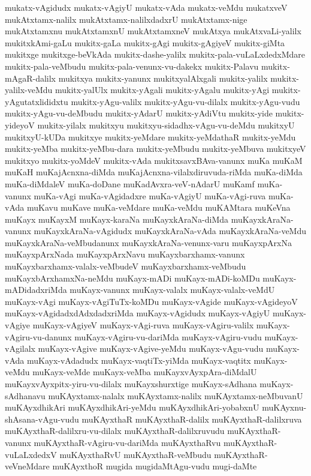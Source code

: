 {mukatx-vAgidudx
mukatx-vAgiyU
mukatx-vAda
mukatx-veMdu
mukatxveV
mukAtxtamx-nalilx
mukAtxtamx-nalilxdadxrU
mukAtxtamx-nige
mukAtxtamxnu
mukAtxtamxnU
mukAtxtamxneV
mukAtxya
mukAtxvaLi-yalilx
mukitxkAmi-gaLu
mukitx-gaLa
mukitx-gAgi
mukitx-gAgiyeV
mukitx-giMta
mukitxge
mukitxge-beVkAda
mukitx-dashe-yalilx
mukitx-pala-vuLaLxdedxMdare
mukitx-pala-veMbudu
mukitx-pala-venunx-vu-dakekx
mukitx-Palavu
mukitx-mAgaR-dalilx
mukitxya
mukitx-yanunx
mukitxyalAlxgali
mukitx-yalilx
mukitx-yalilx-veMdu
mukitx-yalUlx
mukitx-yAgali
mukitx-yAgalu
mukitx-yAgi
mukitx-yAgutatxlididxtu
mukitx-yAgu-valilx
mukitx-yAgu-vu-dilalx
mukitx-yAgu-vudu
mukitx-yAgu-vu-deMbudu
mukitx-yAdarU
mukitx-yAdiVtu
mukitx-yide
mukitx-yideyoV
mukitx-yilalx
mukitxyu
mukitxyu-sidadhx-vAgu-vu-deMdu
mukitxyU
mukitxyU-kUDa
mukitxye
mukitx-yeMdare
mukitx-yeMdathaR
mukitx-yeMdu
mukitx-yeMba
mukitx-yeMbu-dara
mukitx-yeMbudu
mukitx-yeMbuva
mukitxyeV
mukitxyo
mukitx-yoMdeV
mukitx-vAda
mukitxsavxBAva-vanunx
muKa
muKaM
muKaH
muKajAcnxna-diMda
muKajAcnxna-vilalxdiruvuda-riMda
muKa-diMda
muKa-diMdaleV
muKa-doDane
muKadAvxra-veV-nAdarU
muKamf
muKa-vanunx
muKa-vAgi
muKa-vAgidadxre
muKa-vAgiyU
muKa-vAgi-ruva
muKa-vAda
muKavu
muKave
muKa-veMdare
muKa-veMdu
muKAMtara
muKeVna
muKayx
muKayxM
muKayx-karaNa
muKayxkAraNa-diMda
muKayxkAraNa-vanunx
muKayxkAraNa-vAgidudx
muKayxkAraNa-vAda
muKayxkAraNa-veMdu
muKayxkAraNa-veMbudanunx
muKayxkAraNa-venunx-varu
muKayxpArxNa
muKayxpArxNada
muKayxpArxNavu
muKayxbarxhamx-vanunx
muKayxbarxhamx-valalx-veMbudeV
muKayxbarxhamx-veMbudu
muKayxbArxhamxNa-neMdu
muKayx-mADi
muKayx-mADi-koMDu
muKayx-mADidadxriMda
muKayx-vanunx
muKayx-valalx
muKayx-valalx-veMdU
muKayx-vAgi
muKayx-vAgiTuTx-koMDu
muKayx-vAgide
muKayx-vAgideyoV
muKayx-vAgidadxdAdxdadxriMda
muKayx-vAgidudx
muKayx-vAgiyU
muKayx-vAgiye
muKayx-vAgiyeV
muKayx-vAgi-ruva
muKayx-vAgiru-valilx
muKayx-vAgiru-vu-danunx
muKayx-vAgiru-vu-dariMda
muKayx-vAgiru-vudu
muKayx-vAgilalx
muKayx-vAgive
muKayx-vAgive-yeMdu
muKayx-vAgu-vudu
muKayx-vAda
muKayx-vAdadudx
muKayx-vaqtiTx-yiMda
muKayx-vaqtitx
muKayx-veMdu
muKayx-veMde
muKayx-veMba
muKayxvAyxpAra-diMdalU
muKayxvAyxpitx-yiru-vu-dilalx
muKayxshurxtige
muKayx-sAdhana
muKayx-sAdhanavu
muKAyxtamx-nalalx
muKAyxtamx-nalilx
muKAyxtamx-neMbuvanU
muKAyxdhikAri
muKAyxdhikAri-yeMdu
muKAyxdhikAri-yobabxnU
muKAyxnu-shAsana-vAgu-vudu
muKAyxthaR
muKAyxthaR-dalilx
muKAyxthaR-dalilxruva
muKAyxthaR-dalilxru-vu-dilalx
muKAyxthaR-dalilxruvudu
muKAyxthaR-vanunx
muKAyxthaR-vAgiru-vu-dariMda
muKAyxthaRvu
muKAyxthaR-vuLaLxdedxV
muKAyxthaRvU
muKAyxthaR-veMbudu
muKAyxthaR-veVneMdare
muKAyxthoR
mugida
mugidaMtAgu-vudu
mugi-daMte
}

